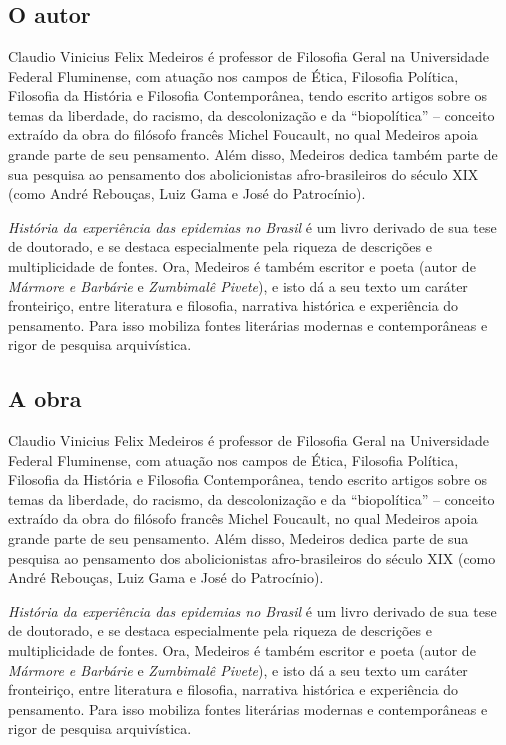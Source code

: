 \chapter*{}

\section{O autor}\label{o-autor}

Claudio Vinicius Felix Medeiros é professor de Filosofia Geral na
Universidade Federal Fluminense, com atuação nos campos de Ética,
Filosofia Política, Filosofia da História e Filosofia Contemporânea,
tendo escrito artigos sobre os temas da liberdade, do racismo, da
descolonização e da ``biopolítica'' -- conceito extraído da obra do
filósofo francês Michel Foucault, no qual Medeiros apoia grande parte de
seu pensamento. Além disso, Medeiros dedica também parte de sua pesquisa
ao pensamento dos abolicionistas afro-brasileiros do século XIX (como
André Rebouças, Luiz Gama e José do Patrocínio).

\emph{História da experiência das epidemias no Brasil} é um livro
derivado de sua tese de doutorado, e se destaca especialmente pela
riqueza de descrições e multiplicidade de fontes. Ora, Medeiros é também
escritor e poeta (autor de \emph{Mármore e Barbárie} e \emph{Zumbimalê
Pivete}), e isto dá a seu texto um caráter fronteiriço, entre literatura
e filosofia, narrativa histórica e experiência do pensamento. Para isso
mobiliza fontes literárias modernas e contemporâneas e rigor de pesquisa
arquivística.

\section{A obra}\label{a-obra}

Claudio Vinicius Felix Medeiros é professor de Filosofia Geral na
Universidade Federal Fluminense, com atuação nos campos de Ética,
Filosofia Política, Filosofia da História e Filosofia Contemporânea,
tendo escrito artigos sobre os temas da liberdade, do racismo, da
descolonização e da ``biopolítica'' -- conceito extraído da obra do
filósofo francês Michel Foucault, no qual Medeiros apoia grande parte de
seu pensamento. Além disso, Medeiros dedica parte de sua pesquisa ao
pensamento dos abolicionistas afro-brasileiros do século XIX (como André
Rebouças, Luiz Gama e José do Patrocínio).

\emph{História da experiência das epidemias no Brasil} é um livro
derivado de sua tese de doutorado, e se destaca especialmente pela
riqueza de descrições e multiplicidade de fontes. Ora, Medeiros é também
escritor e poeta (autor de \emph{Mármore e Barbárie} e \emph{Zumbimalê
Pivete}), e isto dá a seu texto um caráter fronteiriço, entre literatura
e filosofia, narrativa histórica e experiência do pensamento. Para isso
mobiliza fontes literárias modernas e contemporâneas e rigor de pesquisa
arquivística.

